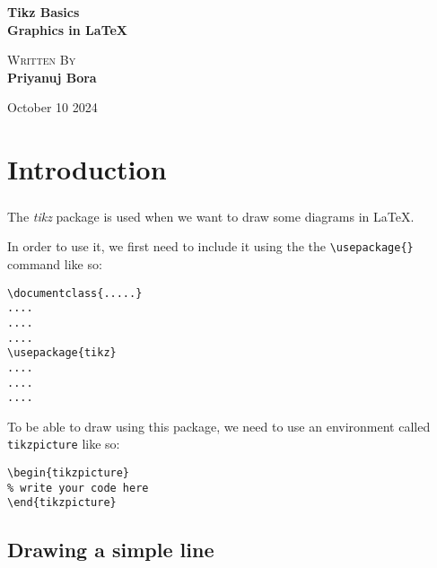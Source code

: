 \documentclass{book}
\newcommand{\bold}[1]{\textbf{#1}}
\begin{document}
	\begin{titlepage}
		\begin{center}
			\Huge\bold{Tikz Basics}\\
			\huge\bold{Graphics in \LaTeX}
			
			\vfill
			
			\Large\textsc{Written By}\\
			\Large\bold{Priyanuj Bora}
			
			\vfill
			
			October 10 2024
		\end{center}
	\end{titlepage}
	
	\pagestyle{plain}
	\tableofcontents
	\lstlistoflistings
	
	\chapter{Introduction}
	\label{ch:ch1}
	\pagestyle{fancy}
	\setcounter{page}{1}
	\paragraph{}
	
	The \emph{tikz} package is used when we want to draw some diagrams in \LaTeX.
	
	In order to use it, we first need to include it using the the \lstinline|\usepackage{}| command like so:
	
\begin{lstlisting}[frame=tlBR, breaklines=true, caption=Format, label=lst:lst0]
\documentclass{.....}
....
....
....
\usepackage{tikz}
....
....
....
\end{lstlisting}
	
	To be able to draw using this package, we need to use an environment called \lstinline|tikzpicture| like so:
	
\begin{lstlisting}[frame=tlBR, breaklines=true, caption=Syntax, label=lst:lst1]
\begin{tikzpicture}
% write your code here
\end{tikzpicture}
\end{lstlisting}

\section{Drawing a simple line}
\label{sec:sec1}
\paragraph{}
\end{document}
